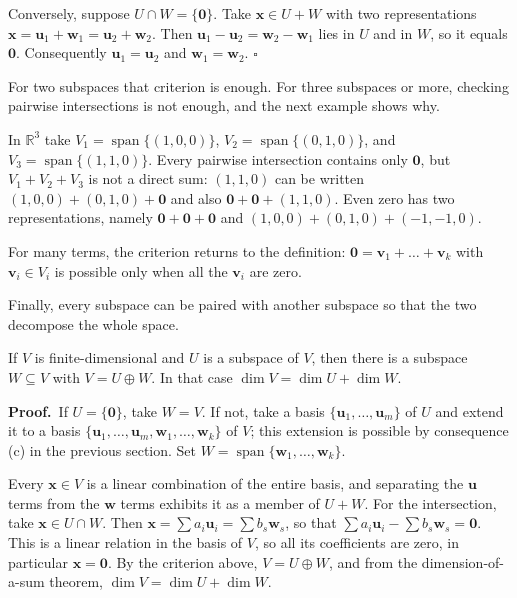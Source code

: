 Conversely, suppose $U\cap W=\{\mathbf{0}\}$. Take $\mathbf{x}\in U+W$ with two representations
$\mathbf{x}=\mathbf{u}_{1}+\mathbf{w}_{1}=\mathbf{u}_{2}+\mathbf{w}_{2}$. Then
$\mathbf{u}_{1}-\mathbf{u}_{2}=\mathbf{w}_{2}-\mathbf{w}_{1}$ lies in $U$ and in $W$, so it equals
$\mathbf{0}$. Consequently $\mathbf{u}_{1}=\mathbf{u}_{2}$ and $\mathbf{w}_{1}=\mathbf{w}_{2}$.
\hfill$\square$\par\medskip

For two subspaces that criterion is enough. For three subspaces or more, checking pairwise
intersections is not enough, and the next example shows why.

In $\mathbb{R}^{3}$ take $V_{1}=\operatorname{span}\{(1,0,0)\}$,
$V_{2}=\operatorname{span}\{(0,1,0)\}$, and $V_{3}=\operatorname{span}\{(1,1,0)\}$. Every
pairwise intersection contains only $\mathbf{0}$, but $V_{1}+V_{2}+V_{3}$ is not a direct sum:
$(1,1,0)$ can be written $(1,0,0)+(0,1,0)+\mathbf{0}$ and also $\mathbf{0}+\mathbf{0}+(1,1,0)$.
Even zero has two representations, namely $\mathbf{0}+\mathbf{0}+\mathbf{0}$ and
$(1,0,0)+(0,1,0)+(-1,-1,0)$.

For many terms, the criterion returns to the definition:
$\mathbf{0}=\mathbf{v}_{1}+\dots+\mathbf{v}_{k}$ with $\mathbf{v}_{i}\in V_{i}$ is possible only
when all the $\mathbf{v}_{i}$ are zero.

Finally, every subspace can be paired with another subspace so that the two decompose the whole
space.

\begin{teorema}[Complement]
If $V$ is finite-dimensional and $U$ is a subspace of $V$, then there is a subspace
$W\subseteq V$ with $V=U\oplus W$. In that case $\dim V=\dim U+\dim W$.
\end{teorema}

\par\medskip\noindent\textbf{Proof.}\ 
If $U=\{\mathbf{0}\}$, take $W=V$. If not, take a basis
$\{\mathbf{u}_{1},\dots,\mathbf{u}_{m}\}$ of $U$ and extend it to a basis
$\{\mathbf{u}_{1},\dots,\mathbf{u}_{m},\mathbf{w}_{1},\dots,\mathbf{w}_{k}\}$ of $V$;
this extension is possible by consequence (c) in the previous section. Set
$W=\operatorname{span}\{\mathbf{w}_{1},\dots,\mathbf{w}_{k}\}$.

Every $\mathbf{x}\in V$ is a linear combination of the entire basis, and separating the
$\mathbf{u}$ terms from the $\mathbf{w}$ terms exhibits it as a member of $U+W$. For the
intersection, take $\mathbf{x}\in U\cap W$. Then
$\mathbf{x}=\sum a_{i}\mathbf{u}_{i}=\sum b_{s}\mathbf{w}_{s}$, so that
$\sum a_{i}\mathbf{u}_{i}-\sum b_{s}\mathbf{w}_{s}=\mathbf{0}$. This is a linear relation in the
basis of $V$, so all its coefficients are zero, in particular $\mathbf{x}=\mathbf{0}$. By the
criterion above, $V=U\oplus W$, and from the dimension-of-a-sum theorem,
$\dim V=\dim U+\dim W$.

